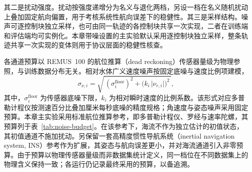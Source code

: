 \documentclass[UTF8,zihao=-4]{ctexrep}
\begin{document}
其二是扰动强度。扰动按强度递增分为名义与退化两档，另设一档在名义随机扰动上叠加固定航向偏置，用于考核系统性航向误差下的稳健性。其三是采样结构。噪声可逐控制块独立采样，也可由同一轨迹的各控制块共享一次实现，二者在训练端和评估端均可实例化。本章带噪设置的主实验默认采用逐控制块独立采样，整条轨迹共享一次实现的变体则用于协议层面的稳健性核查。

各通道预算以 REMUS~100 的航位推算（dead reckoning）传感器量级为物理参照，与训练数据分布无关。相对水体广义速度噪声按固定底噪与速度比例项建模，
\begin{equation}
  \sigma_{\nu,i}=\sqrt{\,(\sigma_i^{\mathrm{floor}})^2+\big(k_i\,\lvert\nu_{r,i}\rvert\big)^2\,},
  \label{eq:nu-noise-model}
\end{equation}
其中，\(\sigma_i^{\mathrm{floor}}\) 为传感器底噪下限，\(k_i\) 为相对瞬时速度的比例系数。该形式对应多普勒计程仪按测速百分比叠加厘米每秒底噪的精度规格；角速度与姿态噪声采用固定预算。本章主实验采用标准航位推算参考，即多普勒计程仪、罗经与速率陀螺，其预算列于表~\ref{tab:noise-budget}。在该参考下，海流不作为独立估计的初值状态，其初值通道不施加扰动。另保留一套高精度惯性导航系统（inertial navigation system, INS）参考作为扩展，其姿态与航向误差更小，并对海流通道引入非零预算。由于预算以物理传感器量级而非数据集统计定义，同一档位在不同数据集上的物理含义保持一致；各运行仍记录最终采用的预算，以备追溯。
\end{document}
